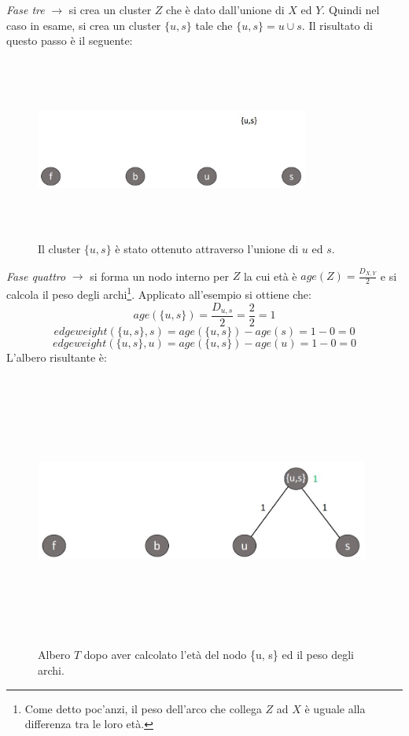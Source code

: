 \newline
\textit{Fase tre} $\rightarrow$ si crea un cluster $Z$ che è dato dall'unione di $X$ ed $Y$. Quindi nel caso in esame, si crea un cluster $\{u, s\}$ tale che $\{u, s\}=u \cup s$. Il risultato di questo passo è il seguente:
\newpage
\begin{figure}[h!]
\centering
	\includegraphics[height=6cm, width=9cm,keepaspectratio]{rooted_upgma_3.jpg}
 	\caption{Il cluster $\{u, s\}$ è stato ottenuto attraverso l'unione di $u$ ed $s$.}
  	\label{fig:rooted_upgma_3}
\end{figure}
\textit{Fase quattro} $\rightarrow$ si forma un nodo interno per $Z$ la cui età è $age(Z)=\frac{D_{X,Y}}{2}$ e si calcola il peso degli archi\footnote{Come detto poc'anzi, il peso dell'arco che collega $Z$ ad $X$ è uguale alla differenza tra le loro età.}. Applicato all'esempio si ottiene che:
\[age(\{u, s\})=\frac{D_{u,s}}{2}=\frac{2}{2}=1\]
\[edgeweight(\{u, s\},s)=age(\{u, s\})-age(s)=1-0=0\]
\[edgeweight(\{u, s\},u)=age(\{u, s\})-age(u)=1-0=0\]
L'albero risultante è:
\begin{figure}[h!]
\centering
	\includegraphics[height=9cm, width=11cm,keepaspectratio]{rooted_upgma_4.jpg}
 	\caption{Albero $T$ dopo aver calcolato l'età del nodo \{u, s\} ed il peso degli archi.}
  	\label{fig:rooted_upgma_4}
\end{figure}
